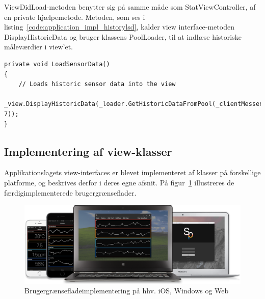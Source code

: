 ViewDidLoad-metoden benytter sig på samme måde som StatViewController, af en private hjælpemetode. Metoden, som ses i listing~\ref{code:application_impl_historylsd}, kalder view interface-metoden DisplayHistoricData og bruger klassens PoolLoader, til at indlæse historiske måleværdier i view'et.

\begin{lstlisting}[caption={LoadSensorData() in HistoryViewController},label={code:application_impl_historylsd}]
private void LoadSensorData()
{
	// Loads historic sensor data into the view
	_view.DisplayHistoricData(_loader.GetHistoricDataFromPool(_clientMessenger, 7));
}
\end{lstlisting}

\subsection{Implementering af view-klasser}
Applikationslagets view-interfaces er blevet implementeret af klasser på forskellige platforme, og beskrives derfor i deres egne afsnit. På figur~\ref{fig:view_family} illustreres de færdigimplementerede brugergrænseflader. 

\begin{figure}
	\centering
	\includegraphics[width=1.0\linewidth]{figs/implementering/view_family}
	\caption{Brugergrænsefladeimplementering på hhv. iOS, Windows og Web}
	\label{fig:view_family}
\end{figure}